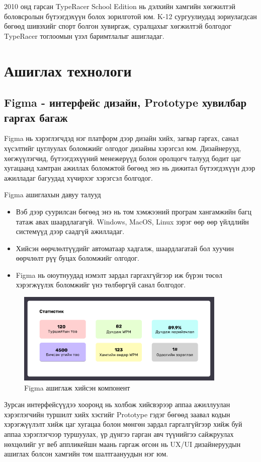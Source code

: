 2010 онд гарсан TypeRacer School Edition нь дэлхийн хамгийн хөгжилтэй боловсролын бүтээгдэхүүн болох зорилготой юм. K-12 сургуулиудад зориулагдсан бөгөөд шивэхийг спорт болгон хувиргаж, суралцахыг хөгжилтэй болгодог TypeRacer тоглоомын үзэл баримтлалыг ашигладаг.
\section{Ашиглах технологи}

\subsection{Figma - интерфейс дизайн, Prototype хувилбар гаргах багаж}
Figma нь хэрэглэгчдэд нэг платформ дээр дизайн хийх, загвар гаргах, санал хүсэлтийг цуглуулах боломжийг олгодог дизайны хэрэгсэл юм. Дизайнерууд, хөгжүүлэгчид, бүтээгдэхүүний менежерүүд болон оролцогч талууд бодит цаг хугацаанд хамтран ажиллах боломжтой бөгөөд энэ нь дижитал бүтээгдэхүүн дээр ажилладаг багуудад хүчирхэг хэрэгсэл болгодог.

Figma ашиглахын давуу талууд
\begin{itemize}
	\item Вэб дээр суурилсан бөгөөд энэ нь том хэмжээний програм хангамжийн багц татаж авах шаардлагагүй. Windows, MacOS, Linux зэрэг өөр өөр үйлдлийн системүүд дээр саадгүй ажилладаг.
	\item Хийсэн өөрчлөлтүүдийг автоматаар хадгалж, шаардлагатай бол хуучин өөрчлөлт рүү буцах боломжийг олгодог.
	\item Figma нь оюутнуудад нэмэлт зардал гаргахгүйгээр иж бүрэн төсөл хэрэгжүүлэх боломжийг үнэ төлбөргүй санал болгодог.
\end{itemize}

\begin{figure}[h]
	\centering
	\includegraphics[width=10cm]{images/figma_component.png}
	\caption{Figma ашиглаж хийсэн компонент}
	\label{fig:figma}
\end{figure}

Зурсан интерфейсүүдээ хооронд нь холбож хийсвэрээр аппаа ажиллуулан хэрэглэгчийн туршилт хийх хэсгийг Prototype гэдэг бөгөөд заавал кодын хэрэгжүүлэлт хийж цаг хугацаа болон мөнгөн зардал гаргалгүйгээр хийж буй аппаа хэрэглэгчээр туршуулах, үр дүнгээ гарган авч түүнийгээ сайжруулах нөхцөлийг уг веб аппликейшн маань гаргаж өгсөн нь UX/UI дизайнеруудын ашиглах болсон хамгийн том шалтгаануудын нэг юм.


